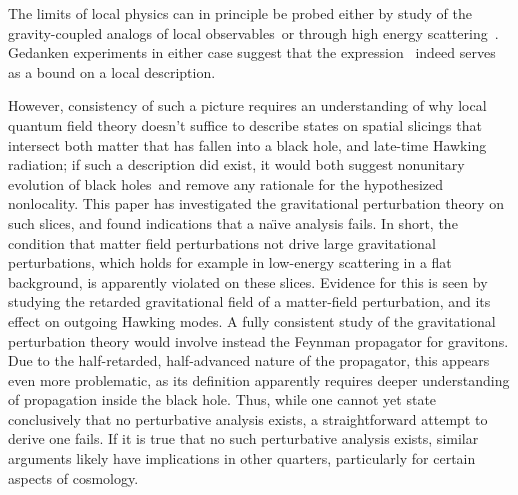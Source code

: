 The limits of local physics can in principle be probed either by study of the gravity-coupled analogs of local observables\GMH\ or through high energy scattering~.  Gedanken experiments in either case suggest that the expression \gravbd\ indeed serves as a bound on a local description.  

However, consistency of such a picture requires an understanding of why local quantum field theory doesn't suffice to describe states on spatial slicings that intersect both matter that has fallen into a black hole, and late-time Hawking radiation; if such a description did exist, it would both suggest nonunitary evolution of black holes\Hawkunc\ and remove any rationale for the hypothesized nonlocality.  This paper has investigated the gravitational perturbation theory on such slices, and found indications that a na\"\i ve analysis fails.  In short, the condition that matter field perturbations not drive large gravitational perturbations, which holds for example in low-energy scattering in a flat background, is apparently violated on these slices.  Evidence for this is seen by studying the retarded gravitational field of a matter-field perturbation, and its effect on outgoing Hawking modes.   A fully consistent study of the gravitational perturbation theory would involve instead the Feynman propagator for gravitons.  Due to the half-retarded, half-advanced nature of the propagator, this appears even more problematic, as its definition apparently requires deeper understanding of propagation inside the black hole.  Thus, while one cannot yet state conclusively that no perturbative analysis exists, a straightforward attempt to derive one fails. If it is true that no such perturbative analysis exists, similar arguments likely have implications in other quarters, particularly for certain aspects of cosmology.

 

